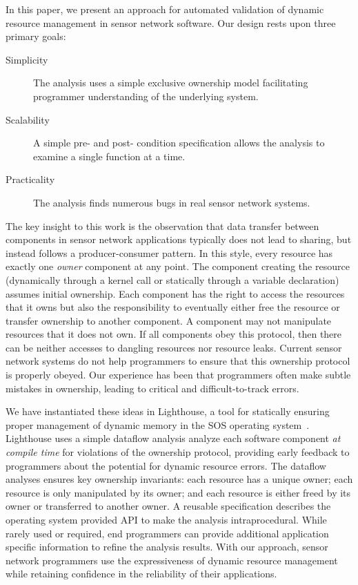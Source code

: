 In this paper, we present an approach for automated validation of dynamic
resource management in sensor network software.  
%
Our design rests upon three primary goals:
%
\begin{description}
%
\item[Simplicity]  The analysis uses a simple exclusive ownership model
facilitating programmer understanding of the underlying system.
%
\item[Scalability]  A simple pre- and post- condition specification allows
the analysis to examine a single function at a time.
%
\item[Practicality] The analysis finds numerous bugs in real sensor network
systems.
%
\end{description}
%
The key insight to this work is the observation that data transfer between
components in sensor network applications typically does not lead to
sharing, but instead follows a producer-consumer pattern.  
%
In this style, every resource has exactly one {\em owner} component at any
point.  
%
The component creating the resource (dynamically through a kernel call or
statically through a variable declaration) assumes initial ownership.  
%
Each component has the right to access the resources that it owns but also
the responsibility to eventually either free the resource or transfer
ownership to another component.  
%
A component may not manipulate resources that it does not own.  
%
If all components obey this protocol, then there can be neither accesses to
dangling resources nor resource leaks.
%
Current sensor network systems do not help programmers to ensure that this
ownership protocol is properly obeyed.  
%
Our experience has been that programmers often make subtle mistakes in
ownership, leading to critical and difficult-to-track errors.  



We have instantiated these ideas in Lighthouse, a tool for statically
ensuring proper management of dynamic memory in the SOS operating
system~\cite{sos}.  
%
Lighthouse uses a simple dataflow analysis analyze each software component
{\em at compile time} for violations of the ownership protocol, providing
early feedback to programmers about the potential for dynamic resource
errors.  
%
The dataflow analyses ensures key ownership invariants:  each resource has a
unique owner; each resource is only manipulated by its owner; and each
resource is either freed by its owner or transferred to another owner.  
%
A reusable specification describes the operating system provided API to make
the analysis intraprocedural.
%
While rarely used or required, end programmers can provide additional
application specific information to refine the analysis results.
%
With our approach, sensor network programmers use the expressiveness of
dynamic resource management while retaining confidence in the reliability of
their applications.




